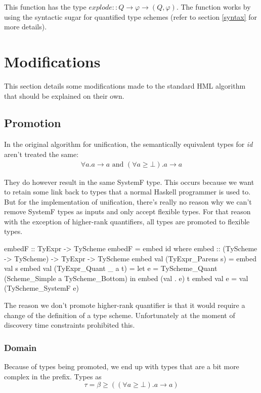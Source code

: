 This function has the type $explode :: Q \rightarrow \varphi \rightarrow (Q, \varphi)$. The function works by using the syntactic sugar for quantified type schemes (refer to section \ref{syntax} for more details).
\section{Modifications}
This section details some modifications made to the standard HML algorithm that should be explained on their own.
\subsection{Promotion}
In the original algorithm for unification, the semantically equivalent types for \emph{id} aren't treated the same:
\begin{eqnarray*}
\forall a. a \rightarrow a \textrm{ and }
(\forall a \geq \bot). a \rightarrow a
\end{eqnarray*}

They do however result in the same SystemF type. This occurs because we want to retain some link back to types that a normal Haskell programmer is used to. But for the implementation of unification, there's really no reason why we can't remove SystemF types as inputs and only accept flexible types. For that reason with the exception of higher-rank quantifiers, all types are promoted to flexible types.

\begin{code}
embedF :: TyExpr -> TyScheme
embedF = embed id
  where  embed :: (TyScheme -> TyScheme) -> TyExpr -> TyScheme
         embed val (TyExpr_Parens     s) = embed val s
         embed val (TyExpr_Quant  _ a t) = 
           let e = TyScheme_Quant (Scheme_Simple a TyScheme_Bottom)
           in  embed (val . e) t
         embed val e                     = val (TyScheme_SystemF e)
\end{code}

The reason we don't promote higher-rank quantifier is that it would require a change of the definition of a type scheme. Unfortunately at the moment of discovery time constraints prohibited this.
\subsubsection{Domain}
Because of types being promoted, we end up with types that are a bit more complex in the prefix. Types as 
\begin{equation}
\tau = \beta \geq ((\forall a \geq \bot). a \rightarrow a)
\end{equation}

